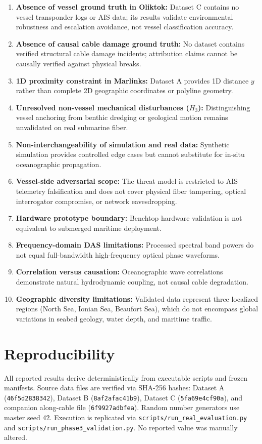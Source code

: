 \documentclass[conference]{IEEEtran}
\begin{document}
\begin{enumerate}
\item \textbf{Absence of vessel ground truth in Oliktok:} Dataset C contains no
vessel transponder logs or AIS data; its results validate environmental
robustness and escalation avoidance, not vessel classification accuracy.
\item \textbf{Absence of causal cable damage ground truth:} No dataset
contains verified structural cable damage incidents; attribution claims cannot
be causally verified against physical breaks.
\item \textbf{1D proximity constraint in Marlinks:} Dataset A provides 1D
distance $y$ rather than complete 2D geographic coordinates or polyline geometry.
\item \textbf{Unresolved non-vessel mechanical disturbances ($H_3$):}
Distinguishing vessel anchoring from benthic dredging or geological motion
remains unvalidated on real submarine fiber.
\item \textbf{Non-interchangeability of simulation and real data:} Synthetic
simulation provides controlled edge cases but cannot substitute for in-situ
oceanographic propagation.
\item \textbf{Vessel-side adversarial scope:} The threat model is restricted to
AIS telemetry falsification and does not cover physical fiber tampering, optical
interrogator compromise, or network eavesdropping.
\item \textbf{Hardware prototype boundary:} Benchtop hardware validation is not
equivalent to submerged maritime deployment.
\item \textbf{Frequency-domain DAS limitations:} Processed spectral band powers
do not equal full-bandwidth high-frequency optical phase waveforms.
\item \textbf{Correlation versus causation:} Oceanographic wave correlations
demonstrate natural hydrodynamic coupling, not causal cable degradation.
\item \textbf{Geographic diversity limitations:} Validated data represent
three localized regions (North Sea, Ionian Sea, Beaufort Sea), which do not
encompass global variations in seabed geology, water depth, and maritime traffic.
\end{enumerate}

\section{Reproducibility}

All reported results derive deterministically from executable scripts and frozen
manifests. Source data files are verified via SHA-256 hashes: Dataset A
(\texttt{46f5d2838342}), Dataset B (\texttt{8af2afac41b9}), Dataset C
(\texttt{5fa69e4cf90a}), and companion along-cable file (\texttt{6f9927adbfea}).
Random number generators use master seed 42. Execution is replicated via
\texttt{scripts/run\_real\_evaluation.py} and
\texttt{scripts/run\_phase3\_validation.py}. No reported value was manually altered.
\end{document}
